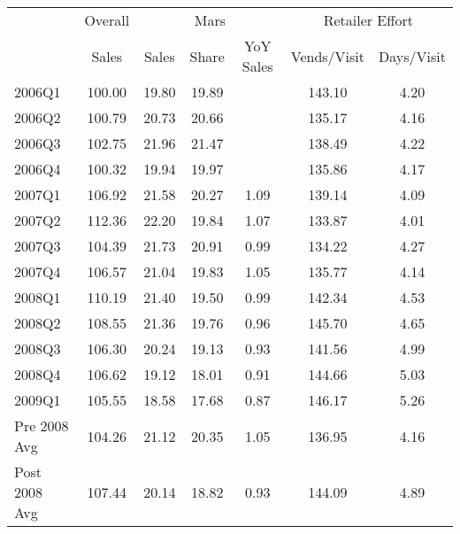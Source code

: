 \begin{tabular}{l c c c c | c c}
\toprule
 & Overall &  \multicolumn{3}{c|}{Mars} &\multicolumn{2}{c}{Retailer Effort} \\
{} &   Sales &  Sales &  Share & YoY Sales & Vends/Visit & Days/Visit \\
\midrule
2006Q1        &  100.00 &  19.80 &  19.89 &           &      143.10 &       4.20 \\
2006Q2        &  100.79 &  20.73 &  20.66 &           &      135.17 &       4.16 \\
2006Q3        &  102.75 &  21.96 &  21.47 &           &      138.49 &       4.22 \\
2006Q4        &  100.32 &  19.94 &  19.97 &           &      135.86 &       4.17 \\
2007Q1        &  106.92 &  21.58 &  20.27 &      1.09 &      139.14 &       4.09 \\
2007Q2        &  112.36 &  22.20 &  19.84 &      1.07 &      133.87 &       4.01 \\
2007Q3        &  104.39 &  21.73 &  20.91 &      0.99 &      134.22 &       4.27 \\
2007Q4        &  106.57 &  21.04 &  19.83 &      1.05 &      135.77 &       4.14 \\
2008Q1        &  110.19 &  21.40 &  19.50 &      0.99 &      142.34 &       4.53 \\
2008Q2        &  108.55 &  21.36 &  19.76 &      0.96 &      145.70 &       4.65 \\
2008Q3        &  106.30 &  20.24 &  19.13 &      0.93 &      141.56 &       4.99 \\
2008Q4        &  106.62 &  19.12 &  18.01 &      0.91 &      144.66 &       5.03 \\
2009Q1        &  105.55 &  18.58 &  17.68 &      0.87 &      146.17 &       5.26 \\
Pre 2008 Avg  &  104.26 &  21.12 &  20.35 &      1.05 &      136.95 &       4.16 \\
Post 2008 Avg &  107.44 &  20.14 &  18.82 &      0.93 &      144.09 &       4.89 \\
\bottomrule
\end{tabular}
